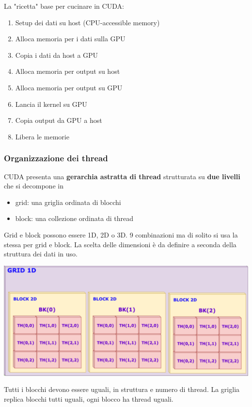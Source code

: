 \newpage

La "ricetta" base per cucinare in CUDA:
\begin{enumerate}
	\item Setup dei dati su host (CPU-accessible memory)
	\item Alloca memoria per i dati sulla GPU
	\item Copia i dati da host a GPU
	\item Alloca memoria per output su host
	\item Alloca memoria per output su GPU
	\item Lancia il kernel su GPU
	\item Copia output da GPU a host
	\item Libera le memorie
\end{enumerate}

\subsubsection{Organizzazione dei thread}
CUDA presenta una \textbf{gerarchia astratta di thread} strutturata su \textbf{due livelli} che si decompone in 
\begin{itemize}
	\item grid: una griglia ordinata di blocchi
	\item block: una collezione ordinata di thread
\end{itemize}
Grid e block possono essere 1D, 2D o 3D. 9 combinazioni ma di solito si usa la stessa per grid e block. La scelta delle dimensioni è da definire a seconda della struttura dei dati in uso.
\begin{center}
	\includegraphics[width=0.98\linewidth]{img/cuda/grdiblock}
\end{center}

Tutti i blocchi devono essere uguali, in struttura e numero di thread. La griglia replica blocchi tutti uguali, ogni blocco ha thread uguali.


